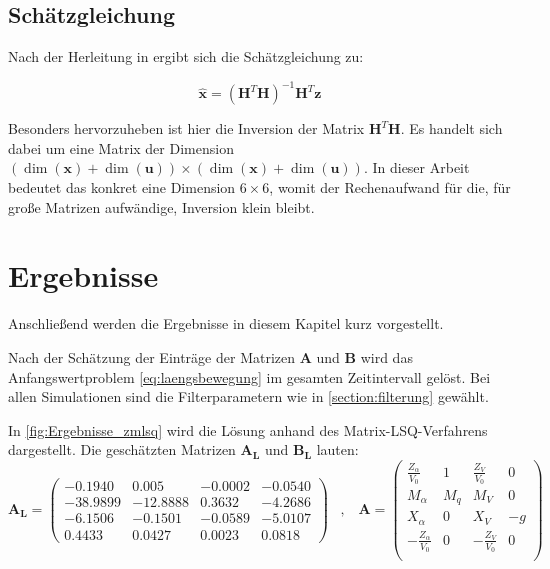 \subsection{Schätzgleichung}

Nach der Herleitung in \cite{Mandry2021} ergibt sich die Schätzgleichung zu:

\begin{equation*}
    \hat{\mathbf{x}} = (\mathbf{H}^T \mathbf{H})^{-1}\mathbf{H}^T\mathbf{z}
\end{equation*}

Besonders hervorzuheben ist hier die Inversion der Matrix $\mathbf{H}^T \mathbf{H}$. Es handelt sich dabei um eine Matrix der 
Dimension $ (\dim{(\mathbf{x})}+\dim{(\mathbf{u})}) \times (\dim{(\mathbf{x})}+\dim{(\mathbf{u})}) $. In dieser Arbeit 
bedeutet das konkret eine Dimension $ 6 \times 6 $, womit der Rechenaufwand für die, für große Matrizen aufwändige, Inversion 
klein bleibt.
 
\section{Ergebnisse}
 
Anschließend werden die Ergebnisse in diesem Kapitel kurz vorgestellt.

Nach der Schätzung der Einträge der Matrizen $\mathbf{A}$ und $\mathbf{B}$ wird das Anfangswertproblem 
\eqref{eq:laengsbewegung} im gesamten Zeitintervall gelöst. Bei allen Simulationen sind die Filterparametern wie in 
\cref{section:filterung} gewählt.

In \cref{fig:Ergebnisse_zmlsq} wird die Lösung anhand des Matrix-LSQ-Verfahrens dargestellt. Die geschätzten Matrizen 
$\mathbf{A_L}$ und $\mathbf{B_L}$ lauten: 
\begin{equation}
 	\mathbf{A_L}\mathbf = \begin{pmatrix}
 		-0.1940 & 0.005 & -0.0002 & -0.0540 \\
 		-38.9899 & -12.8888 & 0.3632 & -4.2686 \\
 		-6.1506 & -0.1501 & -0.0589 & -5.0107 \\
 		0.4433 & 0.0427 & 0.0023 & 0.0818
 	\end{pmatrix} \;\;\; , \;\;\;
 	\mathbf{A} = \begin{pmatrix}
		\frac{Z_\alpha}{V_0} & 1 & \frac{Z_V}{V_0} & 0\\
		M_\alpha & M_q & M_V & 0\\
		X_\alpha & 0 & X_V & -g\\
		-\frac{Z_\alpha}{V_0} & 0 & -\frac{Z_V}{V_0} & 0\\
	\end{pmatrix}
	\nonumber
\end{equation}

